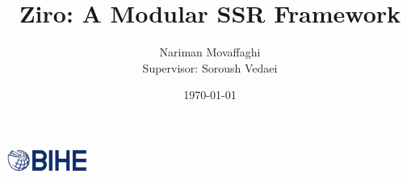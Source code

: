 \documentclass{article}
\author{Nariman Movaffaghi \\[0.4em]
Supervisor: Soroush Vedaei}
\title{Ziro: A Modular SSR Framework}
\date{\small \today}
\begin{document}
\maketitle

\begin{center}
    \vspace{0em}
    \includegraphics[width=0.2\textwidth]{bihe-logo.png} \\[1em]
\end{center}


\pagebreak

\tableofcontents
\pagebreak










\end{document}
